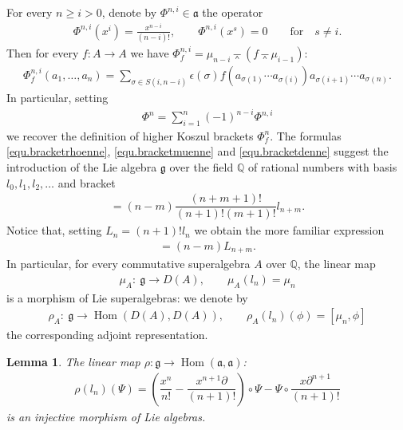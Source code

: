 \documentclass[pdftex]{sigma}
\newcommand{\wedgebar}{\barwedge}
\newcommand{\Hom}{\operatorname{Hom}}
\newcommand{\Q}{\mathbb{Q}}
\numberwithin{equation}{section}
\newtheorem{Lemma}[Theorem]{Lemma}
 { \theoremstyle{definition}
\newtheorem{Definition}[Theorem]{Definition}
\newtheorem{Example}[Theorem]{Example}
\newtheorem{Remark}[Theorem]{Remark} }
\begin{document}
For every $n\ge i>0$, denote by $\Phi^{n,i}\in \mathfrak{a}$ the operator
\begin{gather*} \Phi^{n,i}(x^{i})=\frac{x^{n-i}}{(n-i)!} ,\qquad \Phi^{n,i}(x^s)=0\qquad \text{for}\quad s\not=i.\end{gather*}
Then for every $f\colon A\to A$ we have $\Phi^{n,i}_f=\mu_{n-i}\wedgebar (f\wedgebar\mu_{i-1})$:
\begin{gather*}\Phi^{n,i}_f(a_1,\ldots,a_{n})=\sum_{\sigma\in S(i,n-i)}\epsilon(\sigma)
f(a_{\sigma(1)}\cdots a_{\sigma(i)})a_{\sigma(i+1)}\cdots a_{\sigma(n)}.\end{gather*}
In particular, setting
\begin{gather*} \Phi^n=\sum_{i=1}^n(-1)^{n-i}\Phi^{n,i}\end{gather*}
we recover the def\/inition of higher Koszul brackets $\Phi^n_f$.
The formulas \eqref{equ.bracketrhoenne}, \eqref{equ.bracketmuenne} and \eqref{equ.bracketdenne} suggest the introduction of the Lie algebra
$\mathfrak{g}$ over the f\/ield $\Q$ of rational numbers with basis $l_0,l_1,l_2,\ldots$ and bracket
\begin{gather*}[l_n,l_m]=(n-m)\dfrac{(n+m+1)!}{(n+1)!(m+1)!}l_{n+m}.\end{gather*}
Notice that, setting $L_n=(n+1)! l_n$ we obtain the more familiar expression
\begin{gather*}[L_n,L_m]=(n-m)L_{n+m}.\end{gather*}
In particular, for every commutative superalgebra $A$ over $\Q$, the linear map
\begin{gather*} \mu_A\colon \ \mathfrak{g}\to D(A),\qquad \mu_A(l_n)=\mu_n\end{gather*}
is a morphism of Lie superalgebras: we denote by
\begin{gather*} \rho_A\colon \ \mathfrak{g}\to \Hom(D(A),D(A)),\qquad \rho_A(l_n)(\phi)=[\mu_n,\phi]\end{gather*}
the corresponding adjoint representation.

\begin{Lemma} The linear map $\rho\colon \mathfrak{g}\to \Hom(\mathfrak{a},\mathfrak{a})$:
\begin{gather*} \rho(l_n)(\Psi)=\left(\dfrac{x^n}{n!}-\dfrac{x^{n+1}\partial}{(n+1)!}\right)\circ \Psi-
\Psi\circ \dfrac{x\partial^{n+1}}{(n+1)!}\end{gather*}
is an injective morphism of Lie algebras.
\end{Lemma}
\end{document}
